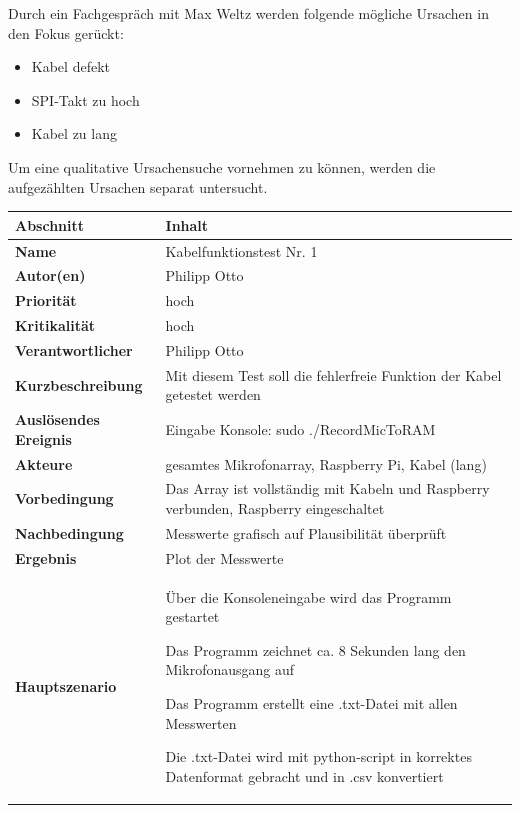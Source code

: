 Durch ein Fachgespräch mit Max Weltz werden folgende mögliche Ursachen in den Fokus gerückt:

\begin{itemize}
	\item Kabel defekt
	\item SPI-Takt zu hoch
	\item Kabel zu lang
\end{itemize}

Um eine qualitative Ursachensuche vornehmen zu können, werden die aufgezählten Ursachen separat untersucht.

\begin{tabularx}{\columnwidth}{|p{4cm}|X|}
	\hline
	\textbf{Abschnitt} & \textbf{Inhalt}\\
	\hline
	\textbf{Name} & Kabelfunktionstest Nr. 1\\
	\hline
	\textbf{Autor(en)} & Philipp Otto\\
	\hline
	\textbf{Priorität} & hoch\\	
	\hline	
	\textbf{Kritikalität} & hoch\\
	\hline
	\textbf{Verantwortlicher} & Philipp Otto\\
	\hline
	\textbf{Kurzbeschreibung} & Mit diesem Test soll die fehlerfreie Funktion der Kabel getestet werden\\
	\hline
	\textbf{Auslösendes Ereignis} & Eingabe Konsole: \glqq sudo ./RecordMicToRAM\grqq\\
	\hline
	\textbf{Akteure} & gesamtes Mikrofonarray, Raspberry Pi, Kabel (lang)\\
	\hline
	\textbf{Vorbedingung} & Das Array ist vollständig mit Kabeln und Raspberry verbunden, Raspberry eingeschaltet\\
	\hline
	\textbf{Nachbedingung} & Messwerte grafisch auf Plausibilität überprüft
	\\
	\hline
	\textbf{Ergebnis} & Plot der Messwerte\\
	\hline
	\textbf{Hauptszenario} & \begin{description}[font=\normalfont]
		\item[1.] Über die Konsoleneingabe wird das Programm gestartet
		\item[2.] Das Programm zeichnet ca. 8 Sekunden lang den Mikrofonausgang auf
		\item[3.] Das Programm erstellt eine .txt-Datei mit allen Messwerten
		\item[4.] Die .txt-Datei wird mit python-script in korrektes Datenformat gebracht und in .csv konvertiert

\end{description}
\end{tabularx}
